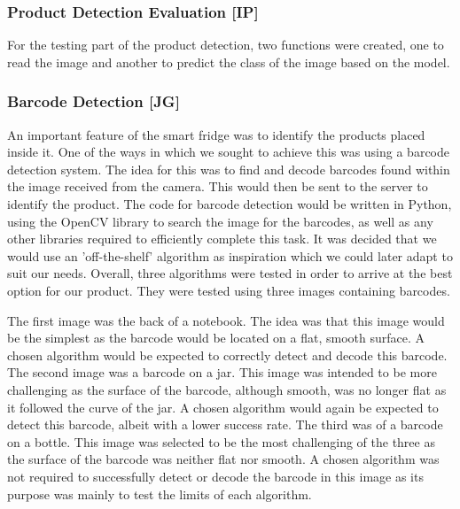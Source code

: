 \subsubsection{Product Detection Evaluation [IP]}

For the testing part of the product detection, two functions were created, one to read the image and another to predict the class of the image based on the model.

\subsubsection{Barcode Detection [JG]}

An important feature of the smart fridge was to identify the products placed inside it.
One of the ways in which we sought to achieve this was using a barcode detection system.
The idea for this was to find and decode barcodes found within the image received from the camera.
This would then be sent to the server to identify the product.
The code for barcode detection would be written in Python, using the OpenCV library to search the image for the barcodes, as well as any other libraries required to efficiently complete this task.
It was decided that we would use an 'off-the-shelf' algorithm as inspiration which we could later adapt to suit our needs.
Overall, three algorithms were tested in order to arrive at the best option for our product.
They were tested using three images containing barcodes.

The first image was the back of a notebook.
The idea was that this image would be the simplest as the barcode would be located on a flat, smooth surface.
A chosen algorithm would be expected to correctly detect and decode this barcode.
The second image was a barcode on a jar.
This image was intended to be more challenging as the surface of the barcode, although smooth, was no longer flat as it followed the curve of the jar.
A chosen algorithm would again be expected to detect this barcode, albeit with a lower success rate.
The third was of a barcode on a bottle.
This image was selected to be the most challenging of the three as the surface of the barcode was neither flat nor smooth.
A chosen algorithm was not required to successfully detect or decode the barcode in this image as its purpose was mainly to test the limits of each algorithm.

